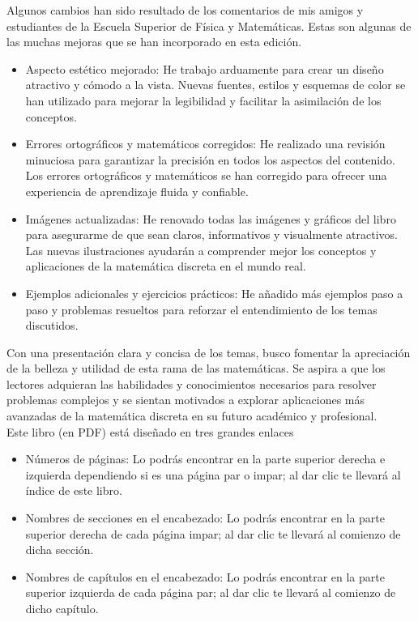 Algunos cambios han sido resultado de los comentarios de mis amigos y estudiantes de la Escuela Superior de Física y Matemáticas. Estas son algunas de las muchas mejoras que se han incorporado en esta edición.
\begin{itemize}
    \item Aspecto estético mejorado: He trabajo arduamente para crear un diseño atractivo y cómodo a la vista. Nuevas fuentes, estilos y esquemas de color se han utilizado para mejorar la legibilidad y facilitar la asimilación de los conceptos.
    \item Errores ortográficos y matemáticos corregidos: He realizado una revisión minuciosa para garantizar la precisión en todos los aspectos del contenido. Los errores ortográficos y matemáticos se han corregido para ofrecer una experiencia de aprendizaje fluida y confiable.
    \item Imágenes actualizadas: He renovado todas las imágenes y gráficos del libro para asegurarme de que sean claros, informativos y visualmente atractivos. Las nuevas ilustraciones ayudarán a comprender mejor los conceptos y aplicaciones de la matemática discreta en el mundo real.
    \item Ejemplos adicionales y ejercicios prácticos: He añadido más ejemplos paso a paso y problemas resueltos para reforzar el entendimiento de los temas discutidos.
\end{itemize}

Con una presentación clara y concisa de los temas, busco fomentar la apreciación de la belleza y utilidad de esta rama de las matemáticas. Se aspira a que los lectores adquieran las habilidades y conocimientos necesarios para resolver problemas complejos y se sientan motivados a explorar aplicaciones más avanzadas de la matemática discreta en su futuro académico y profesional.\\


Este libro (en PDF) está diseñado en tres grandes enlaces
\begin{itemize}
    \item Números de páginas: Lo podrás encontrar en la parte superior derecha e izquierda dependiendo si es una página par o impar; al dar clic te llevará al índice de este libro.
    \item Nombres de secciones en el encabezado: Lo podrás encontrar en la parte superior derecha de cada página impar; al dar clic te llevará al comienzo de dicha sección.
    \item Nombres de capítulos en el encabezado: Lo podrás encontrar en la parte superior izquierda de cada página par; al dar clic te llevará al comienzo de dicho capítulo.
\end{itemize}

